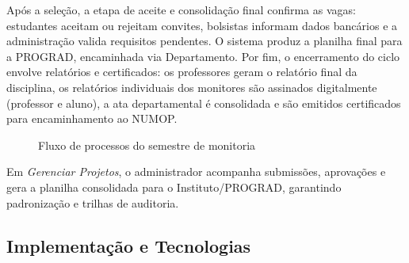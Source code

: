 \documentclass[portuguese]{sbc2025}%
\begin{document}
Após a seleção, a etapa de aceite e consolidação final confirma as vagas: estudantes aceitam ou rejeitam convites, bolsistas informam dados bancários e a administração valida requisitos pendentes. O sistema produz a planilha final para a PROGRAD, encaminhada via Departamento. Por fim, o encerramento do ciclo envolve relatórios e certificados: os professores geram o relatório final da disciplina, os relatórios individuais dos monitores são assinados digitalmente (professor e aluno), a ata departamental é consolidada e são emitidos certificados para encaminhamento ao NUMOP.

\begin{figure}[h!]
  \centering
{}
  \caption{Fluxo de processos do semestre de monitoria}
  \label{fig:process-flow}
\end{figure}

Em \textit{Gerenciar Projetos}, o administrador acompanha submissões, aprovações e gera a planilha consolidada para o Instituto/PROGRAD, garantindo padronização e trilhas de auditoria.

\subsection{Implementação e Tecnologias}
\end{document}
